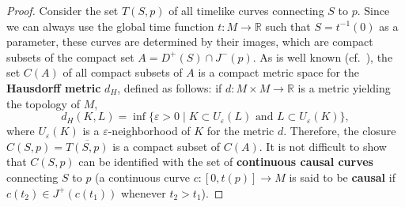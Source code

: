 \documentclass[10pt]{amsart}
\newcommand{\bbR}{\mathbb{R}}      %
\theoremstyle{definition}
\theoremstyle{remark}
\begin{document}
\begin{proof}
Consider the set $T(S,p)$ of all timelike curves connecting $S$ to $p$. Since we can always use the global time function $t:M\to \bbR$ such that $S=t^{-1}(0)$ as a parameter, these curves are determined by their images, which are compact subsets of the compact set $A=D^+(S) \cap J^-(p)$. As is well known (cf.~\cite{Munkres00}), the set $C(A)$ of all compact subsets of $A$ is a compact metric space for the {\bf Hausdorff metric} $d_H$, defined as follows: if $d:M\times M \to \bbR$ is a metric yielding the topology of $M$,
\[
d_H(K,L) = \inf \{ \varepsilon > 0 \mid K \subset U_\varepsilon(L) \text{ and } L \subset U_\varepsilon(K) \},
\]
where $U_{\varepsilon}(K)$ is a $\varepsilon$-neighborhood of $K$ for the metric $d$. Therefore, the closure $C(S,p) = \overline{T(S,p)}$ is a compact subset of $C(A)$. It is not difficult to show that $C(S,p)$ can be identified with the set of {\bf continuous causal curves} connecting $S$ to $p$ (a continuous curve $c:[0,t(p)]\to M$ is said to be {\bf causal} if $c(t_2) \in J^+(c(t_1))$ whenever $t_2 > t_1$).


\end{proof}
\end{document}
